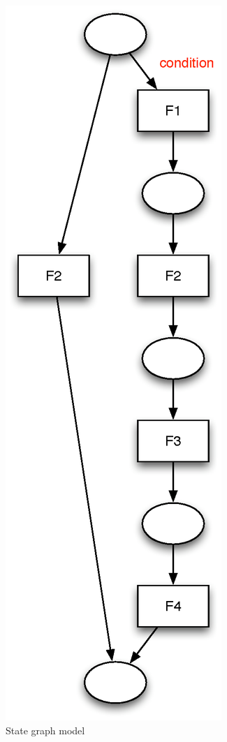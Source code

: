\begin{figure}[hb]
\begin{minipage}[b]{0.5\linewidth}
\includegraphics[scale=0.5]{state_graph.eps}
\caption{State graph model}
\label{fig:state}
\end{minipage}
\end{figure}


